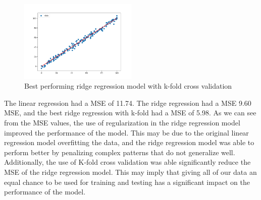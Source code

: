 \documentclass{article}
\begin{document}
\begin{figure}[H]
  \centering
  \includegraphics[width=0.5\textwidth]{best.png}
  \caption{Best performing ridge regression model with k-fold cross validation}
\end{figure}

The linear regression had a MSE of 11.74. The ridge regression had a MSE 9.60 MSE, and the best ridge regression with k-fold had a MSE of 5.98.
As we can see from the MSE values, the use of regularization in the ridge regression model improved the performance of the model.
This may be due to the original linear regression model overfitting the data, and the ridge regression model was able to perform better by penalizing complex patterns that do not generalize well.
Additionally, the use of K-fold cross validation was able significantly reduce the MSE of the ridge regression model.
This may imply that giving all of our data an equal chance to be used for training and testing has a significant impact on the performance of the model.
\end{document}
